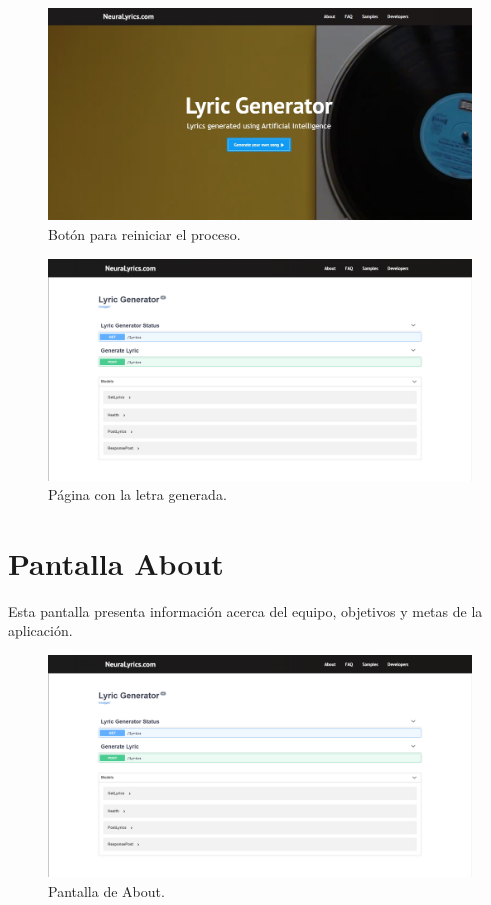 \documentclass[12pt, a4paper, titlepage]{article}
\begin{document}
\begin{itemize}
		\begin{figure}[H] 
			\includegraphics[width=13.5cm]{./Imagenes/Capturas/pprincipal.jpg}
			\centering \caption{Botón para reiniciar el proceso.}
		\end{figure}
	\end{itemize}

\begin{figure}[H] 
	\includegraphics[width=13.5cm]{./Imagenes/Capturas/pdev.png}
	\centering \caption{Página con la letra generada.}
\end{figure}

		\section{Pantalla About}
		Esta pantalla presenta información acerca del equipo, objetivos y metas de la aplicación.
		
		\begin{figure}[H] 
			\includegraphics[width=13.5cm]{./Imagenes/Capturas/pdev.png}
			\centering \caption{Pantalla de About.}
		\end{figure}
	
\end{document}
